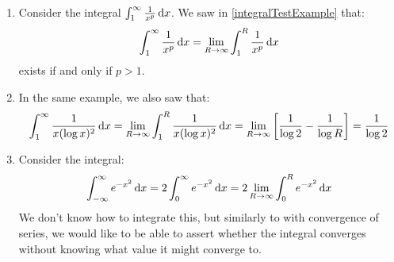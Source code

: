 \documentclass[../main.tex]{subfiles}
\begin{document}
\begin{example} \label{improperIntegralExamples}
  \begin{enumerate}
    \item Consider the integral $\int_{1}^{\infty} \frac{1}{x^{p}} \d{x}$.
      We saw in \cref{integralTestExample} that:
      \[
        \int_{1}^{\infty} \frac{1}{x^{p}} \d{x} = \lim_{R \to \infty} \int_{1}^{R} \frac{1}{x^{p}} \d{x}
      \]
      exists if and only if $p > 1$.
    \item In the same example, we also saw that:
      \[
        \int_{1}^{\infty} \frac{1}{x (\log x)^2} \d{x} = \lim_{R \to \infty} \int_{1}^{R} \frac{1}{x (\log x)^2} \d{x} = \lim_{R \to \infty} \left[\frac{1}{\log 2} - \frac{1}{\log R}\right] = \frac{1}{\log 2}
      \]
    \item Consider the integral:
      \[
        \int_{-\infty}^{\infty} e^{-x^2} \d{x} = 2 \int_{0}^{\infty} e^{-x^2} \d{x} = 2 \lim_{R \to \infty} \int_{0}^{R} e^{-x^2} \d{x}
      \]
      We don't know how to integrate this, but similarly to with convergence of series, we would like to be able to assert whether the integral converges without knowing what value it might converge to.
  \end{enumerate}
\end{example}
\end{document}
